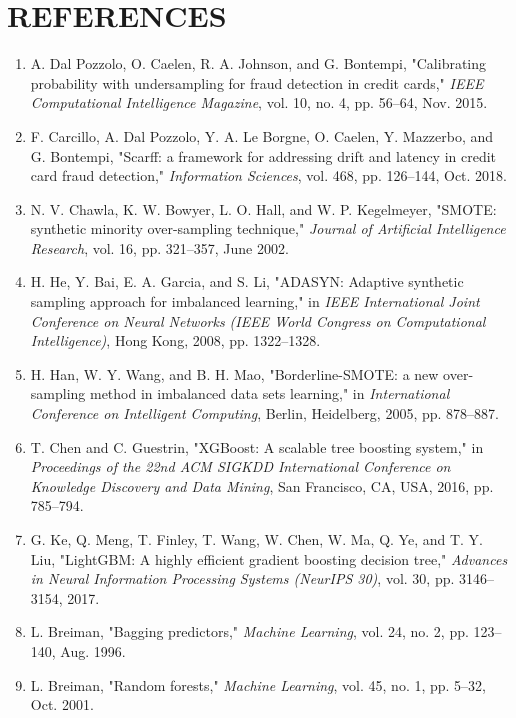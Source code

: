 \documentclass[12pt,a4paper,oneside]{report}
\begin{document}
\newpage


\chapter*{REFERENCES}

\begin{enumerate}[leftmargin=0.35in]
\item A. Dal Pozzolo, O. Caelen, R. A. Johnson, and G. Bontempi, "Calibrating probability with undersampling for fraud detection in credit cards," \textit{IEEE Computational Intelligence Magazine}, vol. 10, no. 4, pp. 56--64, Nov. 2015.
\item F. Carcillo, A. Dal Pozzolo, Y. A. Le Borgne, O. Caelen, Y. Mazzerbo, and G. Bontempi, "Scarff: a framework for addressing drift and latency in credit card fraud detection," \textit{Information Sciences}, vol. 468, pp. 126--144, Oct. 2018.
\item N. V. Chawla, K. W. Bowyer, L. O. Hall, and W. P. Kegelmeyer, "SMOTE: synthetic minority over-sampling technique," \textit{Journal of Artificial Intelligence Research}, vol. 16, pp. 321--357, June 2002.
\item H. He, Y. Bai, E. A. Garcia, and S. Li, "ADASYN: Adaptive synthetic sampling approach for imbalanced learning," in \textit{IEEE International Joint Conference on Neural Networks (IEEE World Congress on Computational Intelligence)}, Hong Kong, 2008, pp. 1322--1328.
\item H. Han, W. Y. Wang, and B. H. Mao, "Borderline-SMOTE: a new over-sampling method in imbalanced data sets learning," in \textit{International Conference on Intelligent Computing}, Berlin, Heidelberg, 2005, pp. 878--887.
\item T. Chen and C. Guestrin, "XGBoost: A scalable tree boosting system," in \textit{Proceedings of the 22nd ACM SIGKDD International Conference on Knowledge Discovery and Data Mining}, San Francisco, CA, USA, 2016, pp. 785--794.
\item G. Ke, Q. Meng, T. Finley, T. Wang, W. Chen, W. Ma, Q. Ye, and T. Y. Liu, "LightGBM: A highly efficient gradient boosting decision tree," \textit{Advances in Neural Information Processing Systems (NeurIPS 30)}, vol. 30, pp. 3146--3154, 2017.
\item L. Breiman, "Bagging predictors," \textit{Machine Learning}, vol. 24, no. 2, pp. 123--140, Aug. 1996.
\item L. Breiman, "Random forests," \textit{Machine Learning}, vol. 45, no. 1, pp. 5--32, Oct. 2001.

\end{enumerate}
\end{document}
